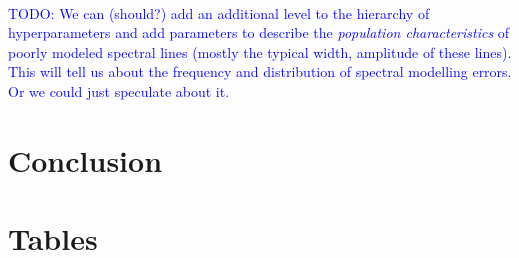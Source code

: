 \documentclass[iop,floatfix]{emulateapj}
\newcommand{\todo}[1]{ \textcolor{blue}{\\TODO: #1}}
\begin{document}
\todo{We can (should?) add an additional level to the hierarchy of hyperparameters and add parameters to describe the \emph{population characteristics} of poorly modeled spectral lines (mostly the typical width, amplitude of these lines).  This will tell us about the frequency and distribution of spectral modelling errors. Or we could just speculate about it.}

\section{Conclusion}
\label{sec:conclusion}




\section{Tables}
\end{document}
